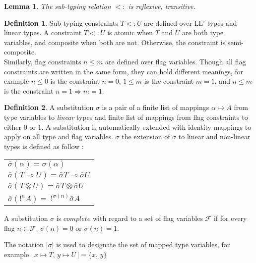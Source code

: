 \documentclass[9pt]{article}
\theoremstyle{plain}
\theoremstyle{definition}
\newtheorem{defn}{Definition}[subsection] %
\newtheorem{lemma}{Lemma}[section]
\begin{document}
\begin{lemma} \it The sub-typing relation $<:$ is reflexive, transitive.
\end{lemma}

\begin{defn} Sub-typing constraints $T <: U$ are defined over LL' types and linear types. A constraint $T <: U$ is atomic
  when $T$ and $U$ are both type variables, and composite when both are not. Otherwise, the constraint is semi-composite. \\
  Similarly, flag constraints $n \le m$ are defined over flag variables. Though all flag constraints are written in the same
  form, they can hold different meanings, for example $n \le 0$ is the constraint $n = 0$, $1 \le m$ is the constraint
  $m = 1$, and $n \le m$ is the constraint $n = 1 \Rightarrow m = 1$.
  
\end{defn}

\begin{defn} A substitution $\sigma$ is a pair of a finite list of mappings $\alpha \mapsto A$ from type variables to
	\textit{linear} types 	and finite list of mappings from flag constraints to either $0$ or $1$.
	A substitution is automatically extended with identity mappings to apply on all type and flag variables.
	$\bar{\sigma}$ the extension of $\sigma$ to linear and non-linear types is defined as follow :
 		\begin{center}
 		\begin{tabular}{l}
 			$\bar{\sigma}(\alpha) = \sigma(\alpha)$ \\
 			$\bar{\sigma}(T \multimap U) = \bar{\sigma}T \multimap \bar{\sigma}U$ \\
 			$\bar{\sigma}(T \otimes U) = \bar{\sigma}T \otimes \bar{\sigma}U$ \\
 			$\bar{\sigma}(!^n A) = ~ !^{\sigma(n)} \bar{\sigma}A$
 		\end{tabular}
 		\end{center}
 	A substitution $\sigma$ is $\textit{complete}$ with regard to a set of flag variables $\mathcal{F}$ if for every flag $n \in \mathcal{F}$,
 	$\sigma (n) = 0$ or $\sigma (n) = 1$.
 	
 	The notation $|\sigma|$ is used to designate the set of mapped type variables, for example
 	$ | \,x \mapsto T, \, y \mapsto U\,| = \{ x, \,y \} $
\end{defn}
\end{document}
